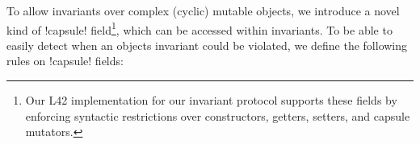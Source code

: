 To allow invariants over complex (cyclic) mutable objects, we introduce a novel kind of \Q!capsule! field\footnote{
Our L42 implementation for our invariant protocol supports these fields by enforcing syntactic
restrictions over constructors, getters, setters, and capsule mutators.}, which can be accessed within invariants.
To be able to easily detect when an objects invariant could be violated, we define the following rules on \Q!capsule! fields:
